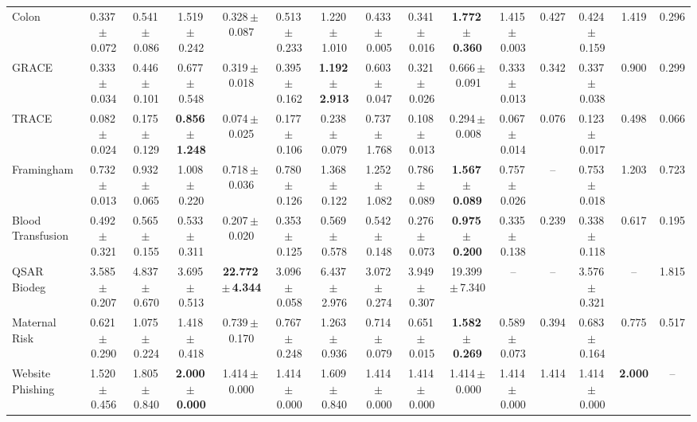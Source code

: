 \documentclass[8pt]{extarticle}
\begin{document}
\begin{longtable}{l*{14}{c}}
Colon & 0.337\,$\pm$\,0.072 & 0.541\,$\pm$\,0.086 & 1.519\,$\pm$\,0.242 & 0.328\,$\pm$\,0.087 & 0.513\,$\pm$\,0.233 & 1.220\,$\pm$\,1.010 & 0.433\,$\pm$\,0.005 & 0.341\,$\pm$\,0.016 & \textbf{1.772\,$\pm$\,0.360} & 1.415\,$\pm$\,0.003 & 0.427 & 0.424\,$\pm$\,0.159 & 1.419 & 0.296 \\
GRACE & 0.333\,$\pm$\,0.034 & 0.446\,$\pm$\,0.101 & 0.677\,$\pm$\,0.548 & 0.319\,$\pm$\,0.018 & 0.395\,$\pm$\,0.162 & \textbf{1.192\,$\pm$\,2.913} & 0.603\,$\pm$\,0.047 & 0.321\,$\pm$\,0.026 & 0.666\,$\pm$\,0.091 & 0.333\,$\pm$\,0.013 & 0.342 & 0.337\,$\pm$\,0.038 & 0.900 & 0.299 \\
TRACE & 0.082\,$\pm$\,0.024 & 0.175\,$\pm$\,0.129 & \textbf{0.856\,$\pm$\,1.248} & 0.074\,$\pm$\,0.025 & 0.177\,$\pm$\,0.106 & 0.238\,$\pm$\,0.079 & 0.737\,$\pm$\,1.768 & 0.108\,$\pm$\,0.013 & 0.294\,$\pm$\,0.008 & 0.067\,$\pm$\,0.014 & 0.076 & 0.123\,$\pm$\,0.017 & 0.498 & 0.066 \\
Framingham & 0.732\,$\pm$\,0.013 & 0.932\,$\pm$\,0.065 & 1.008\,$\pm$\,0.220 & 0.718\,$\pm$\,0.036 & 0.780\,$\pm$\,0.126 & 1.368\,$\pm$\,0.122 & 1.252\,$\pm$\,1.082 & 0.786\,$\pm$\,0.089 & \textbf{1.567\,$\pm$\,0.089} & 0.757\,$\pm$\,0.026 & -- & 0.753\,$\pm$\,0.018 & 1.203 & 0.723 \\
Blood Transfusion & 0.492\,$\pm$\,0.321 & 0.565\,$\pm$\,0.155 & 0.533\,$\pm$\,0.311 & 0.207\,$\pm$\,0.020 & 0.353\,$\pm$\,0.125 & 0.569\,$\pm$\,0.578 & 0.542\,$\pm$\,0.148 & 0.276\,$\pm$\,0.073 & \textbf{0.975\,$\pm$\,0.200} & 0.335\,$\pm$\,0.138 & 0.239 & 0.338\,$\pm$\,0.118 & 0.617 & 0.195 \\
QSAR Biodeg & 3.585\,$\pm$\,0.207 & 4.837\,$\pm$\,0.670 & 3.695\,$\pm$\,0.513 & \textbf{22.772\,$\pm$\,4.344} & 3.096\,$\pm$\,0.058 & 6.437\,$\pm$\,2.976 & 3.072\,$\pm$\,0.274 & 3.949\,$\pm$\,0.307 & 19.399\,$\pm$\,7.340 & -- & -- & 3.576\,$\pm$\,0.321 & -- & 1.815 \\
Maternal Risk & 0.621\,$\pm$\,0.290 & 1.075\,$\pm$\,0.224 & 1.418\,$\pm$\,0.418 & 0.739\,$\pm$\,0.170 & 0.767\,$\pm$\,0.248 & 1.263\,$\pm$\,0.936 & 0.714\,$\pm$\,0.079 & 0.651\,$\pm$\,0.015 & \textbf{1.582\,$\pm$\,0.269} & 0.589\,$\pm$\,0.073 & 0.394 & 0.683\,$\pm$\,0.164 & 0.775 & 0.517 \\
Website Phishing & 1.520\,$\pm$\,0.456 & 1.805\,$\pm$\,0.840 & \textbf{2.000\,$\pm$\,0.000} & 1.414\,$\pm$\,0.000 & 1.414\,$\pm$\,0.000 & 1.609\,$\pm$\,0.840 & 1.414\,$\pm$\,0.000 & 1.414\,$\pm$\,0.000 & 1.414\,$\pm$\,0.000 & 1.414\,$\pm$\,0.000 & 1.414 & 1.414\,$\pm$\,0.000 & \textbf{2.000} & -- \\
\end{longtable}
\end{document}
